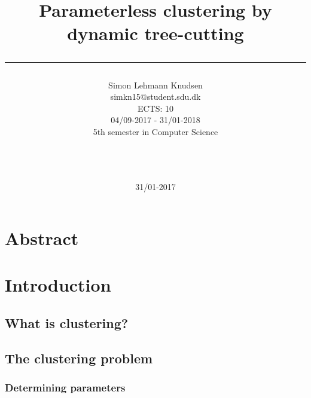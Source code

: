 \documentclass[a4paper,10pt]{article}
\title{ Parameterless clustering by dynamic tree-cutting \rule{10cm}{0.5mm}}
\author{Simon Lehmann Knudsen \\
	simkn15@student.sdu.dk \\
	ECTS: 10 \\
	04/09-2017 - 31/01-2018 \\
	5th semester in Computer Science
\\\rule{5.5cm}{0.5mm}\\}
\date{31/01-2017}
\begin{document}
\maketitle

\newpage
\tableofcontents

\newpage
\section{Abstract}

\newpage
\section{Introduction}

\subsection{What is clustering?}

\subsection{The clustering problem}

\subsubsection{Determining parameters}
\end{document}
